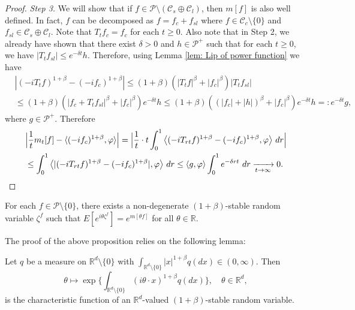 \documentclass[EJP]{ejpecp} %
\begin{document}
\begin{proof}
	\emph{Step 3.} We will show that if $f\in \mathcal P \setminus (\mathcal C_s \oplus \mathcal C_l)$, then $m[f]$ is also well defined.
  	In fact, $f$ can be decomposed as $f = f_c + f_{sl}$ where $f \in \mathcal C_c\setminus \{0\}$ and $f_{sl}\in \mathcal C_s \oplus \mathcal C_l$.
  	Note that $T_t f_c = f_c$ for each $t\geq 0$.
  	Also note that in Step 2, we already have shown that there exist $\delta > 0$ and $h \in \mathcal P^+$ such that for each $t\geq 0$, we have $|T_t f_{sl}| \leq e^{- \delta t}h$.
  	Therefore, using Lemma \ref{lem: Lip of power function} we have
\begin{align}
    &|(-iT_t f)^{1+\beta} - (-i f_c)^{1+\beta}|
   	\leq (1+\beta) ( |T_tf|^\beta + |f_c|^\beta) |T_tf_{sl}|
    \\&\leq (1+\beta) ( |f_c + T_t f_{sl}|^\beta + |f_c|^\beta) e^{- \delta t} h
    \leq (1+\beta) ( (|f_c| + |h|)^\beta + |f_c|^\beta) e^{- \delta t} h
    =: e^{- \delta t} g,
\end{align}
  	where $g\in \mathcal P^+$.
  	Therefore
\begin{align}
\label{eq:P:S:1}
    &\Big| \frac{1}{t} m_t[f] - \langle (-if_c)^{1+\beta}, \varphi\rangle\Big|
    = \Big| \frac{1}{t} \cdot t \int_0^1  \big\langle (-iT_{rt}f)^{1+\beta} - (-if_c)^{1+\beta}, \varphi\big \rangle ~dr \Big|\\
    &\leq \int_0^1  \big\langle |(-iT_{rt}f)^{1+\beta} - (-if_c)^{1+\beta}|, \varphi\big \rangle ~dr
    \leq \langle g,\varphi\rangle\int_0^1 e^{-\delta rt} ~dr
    \xrightarrow[t\to \infty]{} 0.
\qedhere
\end{align}
\end{proof}

\begin{proposition}
\label{prop:PL:S}
  	For each $f \in \mathcal P\setminus \{0\}$, there exists a non-degenerate $(1+\beta)$-stable random variable $\zeta^f$ such that $ E[e^{i\theta\zeta^f}] = e^{m[\theta f]}$ for all $\theta \in \mathbb R$.
\end{proposition}

	The proof of the above proposition relies on the following lemma:

\begin{lemma}
\label{lem: charactreisticfunction}
  	Let $q$ be a measure on $\mathbb R^d\setminus\{0\}$ with $\int_{\mathbb R^d\setminus\{0\}} |x|^{1+\beta} q(dx) \in (0,\infty)$.
Then
\[
    \theta
    \mapsto  \exp\Big\{\int_{\mathbb R^d\setminus\{0\}} (i\theta \cdot x)^{1+\beta} q(dx)\Big\},
    \quad \theta \in \mathbb R^d,
\]
  	is the characteristic function of an $\mathbb R^d$-valued $(1+\beta)$-stable random variable.
\end{lemma}
\end{document}
